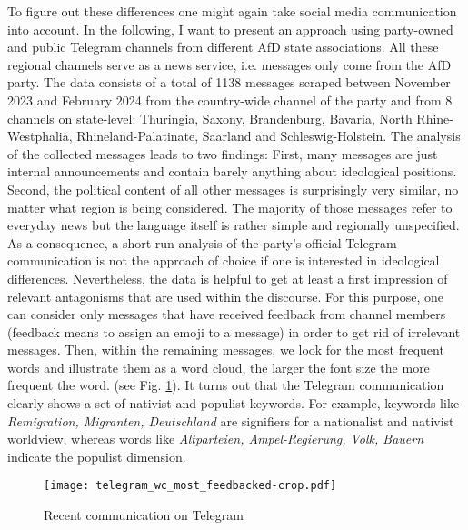 \documentclass[a4paper]{scrreprt}
\begin{document}
To figure out these differences one might again take social media communication into account. In the following, I want to present an approach using party-owned and public Telegram channels from different AfD state associations. All these regional channels serve as a news service, i.e. messages only come from the AfD party. The data consists of a total of 1138 messages scraped between November 2023 and February 2024 from the country-wide channel of the party and from 8 channels on state-level: Thuringia, Saxony, Brandenburg, Bavaria, North Rhine-Westphalia, Rhineland-Palatinate, Saarland and Schleswig-Holstein. The analysis of the collected messages leads to two findings: First, many messages are just internal announcements and contain barely anything about ideological positions. Second, the political content of all other messages is surprisingly very similar, no matter what region is being considered. The majority of those messages refer to everyday news but the language itself is rather simple and regionally unspecified. As a consequence, a short-run analysis of the party's official Telegram communication is not the approach of choice if one is interested in ideological differences. Nevertheless, the data is helpful to get at least a first impression of relevant antagonisms that are used within the discourse. For this purpose, one can consider only messages that have received feedback from channel members (feedback means to assign an emoji to a message) in order to get rid of irrelevant messages. Then, within the remaining messages, we look for the most frequent words and illustrate them as a word cloud, the larger the font size the more frequent the word. (see Fig. \ref{fig:fig1}). It turns out that the Telegram communication clearly shows a set of nativist and populist keywords. For example, keywords like {\em Remigration, Migranten, Deutschland} are signifiers for a nationalist and nativist worldview, whereas words like {\em Altparteien, Ampel-Regierung, Volk, Bauern} indicate the populist dimension.\par
\begin{figure}
    \centering
    \texttt{[image: telegram\_wc\_most\_feedbacked-crop.pdf]}
    \caption{Recent communication on Telegram}
    \label{fig:fig1}
\end{figure}
\end{document}
